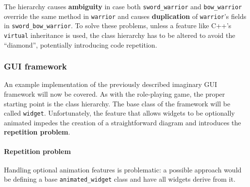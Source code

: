 \documentclass[twoside, 12pt, a4paper, openany]{book}
\begin{document}
The hierarchy causes \textbf{ambiguity} in case both
\texttt{sword_warrior}
and
\texttt{bow_warrior}
override the same method in
\texttt{warrior}
and causes \textbf{duplication} of
\texttt{warrior}'s
fields in
\texttt{sword_bow_warrior}.
To solve these problems, unless a feature like C++'s
\texttt{virtual}
inheritance is used, the class hierarchy has to be altered to avoid the
``diamond'', potentially introducing code repetition.

\subsubsection{GUI framework}\label{gui-framework-1}

An example implementation of the previously described imaginary GUI
framework will now be covered. As with the role-playing game, the proper
starting point is the class hierarchy. The base class of the framework
will be called
\texttt{widget}.
Unfortunately, the feature that allows widgets to be optionally animated
impedes the creation of a straightforward diagram and introduces the
\textbf{repetition problem}.

\paragraph{Repetition problem}\label{repetition-problem}

Handling optional animation features is problematic: a possible approach
would be defining a base
\texttt{animated_widget}
class and have all widgets derive from it.
\end{document}
